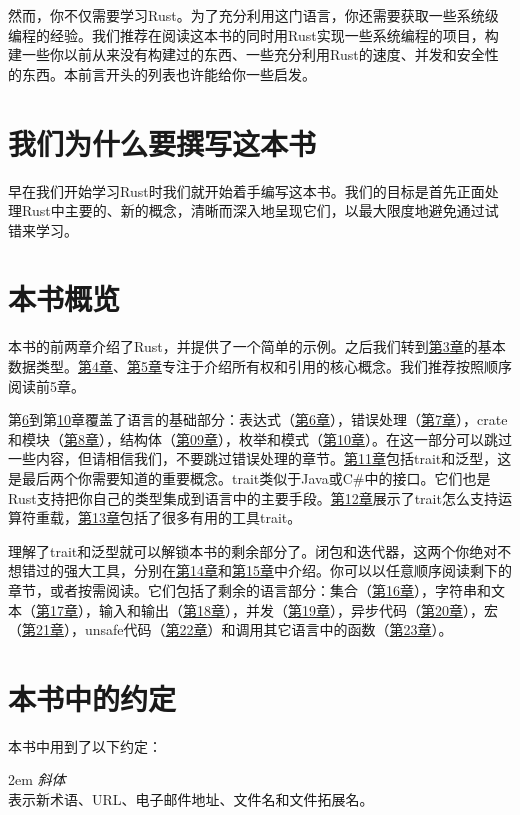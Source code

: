 然而，你不仅需要学习Rust。为了充分利用这门语言，你还需要获取一些系统级编程的经验。我们推荐在阅读这本书的同时用Rust实现一些系统编程的项目，构建一些你以前从来没有构建过的东西、一些充分利用Rust的速度、并发和安全性的东西。本前言开头的列表也许能给你一些启发。

\section*{我们为什么要撰写这本书}
早在我们开始学习Rust时我们就开始着手编写这本书。我们的目标是首先正面处理Rust中主要的、新的概念，清晰而深入地呈现它们，以最大限度地避免通过试错来学习。

\section*{本书概览}
本书的前两章介绍了Rust，并提供了一个简单的示例。之后我们转到\hyperref[ch03]{第3章}的基本数据类型。\hyperref[ch04]{第4章}、\hyperref[ch05]{第5章}专注于介绍所有权和引用的核心概念。我们推荐按照顺序阅读前5章。

第\hyperref[ch06]{6}到第\hyperref[ch10]{10}章覆盖了语言的基础部分：表达式（\hyperref[ch06]{第6章}），错误处理（\hyperref[ch07]{第7章}），crate和模块（\hyperref[ch08]{第8章}），结构体（\hyperref[ch9]{第09章}），枚举和模式（\hyperref[ch10]{第10章}）。在这一部分可以跳过一些内容，但请相信我们，不要跳过错误处理的章节。\hyperref[ch11]{第11章}包括trait和泛型，这是最后两个你需要知道的重要概念。trait类似于Java或C\#中的接口。它们也是Rust支持把你自己的类型集成到语言中的主要手段。\hyperref[ch12]{第12章}展示了trait怎么支持运算符重载，\hyperref[ch13]{第13章}包括了很多有用的工具trait。

理解了trait和泛型就可以解锁本书的剩余部分了。闭包和迭代器，这两个你绝对不想错过的强大工具，分别在\hyperref[ch14]{第14章}和\hyperref[ch15]{第15章}中介绍。你可以以任意顺序阅读剩下的章节，或者按需阅读。它们包括了剩余的语言部分：集合（\hyperref[ch16]{第16章}），字符串和文本（\hyperref[ch17]{第17章}），输入和输出（\hyperref[ch18]{第18章}），并发（\hyperref[ch19]{第19章}），异步代码（\hyperref[ch20]{第20章}），宏（\hyperref[ch21]{第21章}），unsafe代码（\hyperref[ch22]{第22章}）和调用其它语言中的函数（\hyperref[ch23]{第23章}）。

\section*{本书中的约定}
本书中用到了以下约定：

\hangindent 2em
\noindent
\emph{斜体}\\
表示新术语、URL、电子邮件地址、文件名和文件拓展名。

